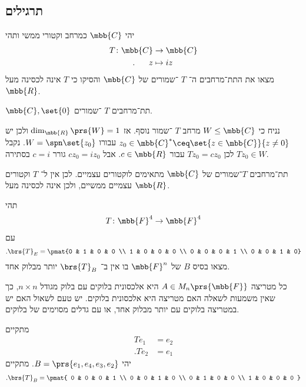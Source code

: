 \documentclass[a4paper,10pt,oneside,openany]{article}
\begin{document}
\subsection{תרגילים}

\begin{exercise}
יהי
$\mbb{C}$
כמרחב וקטורי ממשי ותהי
\begin{align*}
T \colon \mbb{C} &\to \mbb{C} \\
\text{.} \hphantom{lala} z &\mapsto iz
\end{align*}
מצאו את התת־מרחבים ה־%
$T$%
־שמורים של
$\mbb{C}$
והסיקו כי
$T$
אינה לכסינה מעל
$\mbb{R}$.
\end{exercise}

\begin{solution}
$\mbb{C}, \set{0}$
תת־מרחבים
$T$%
־שמורים.

נניח כי
$W \leq \mbb{C}$
מרחב
$T$%
־שמור נוסף. אז
$\dim_{\mbb{R}}\prs{W} = 1$
ולכן יש
$z_0 \in \mbb{C}^* \ceq \set{z \in \mbb{C}}{z \neq 0}$
עבורו
$W = \spn\set{z_0}$.
נקבל
$Tz_0 \in W$
לכן
$Tz_0 = c z_0$
עבור
$c \in \mbb{R}$.
אבל
$c z_0 = i z_0$
גורר
$c = i$
בסתירה.

תת־מרחבים $T$־שמורים של
$\mbb{C}$
מתאימים לוקטורים עצמיים. לכן אין ל־%
$T$
וקטורים עצמיים ממשיים, ולכן אינה לכסינה מעל
$\mbb{R}$.
\end{solution}

\begin{exercise}
תהי
\begin{align*}
T \colon \mbb{F}^4 \to \mbb{F}^4
\end{align*}
עם
\[\text{.} \brs{T}_E = \pmat{0 & 1 & 0 & 0 \\ 1 & 0 & 0 & 0 \\ 0 & 0 & 0 & 1 \\ 0 & 0 & 1 & 0}\]
מצאו בסיס
$B$
של
$\mbb{F}^n$
בו אין ב־%
$\brs{T}_B$
יותר מבלוק אחד.
\end{exercise}

\begin{remark}
כל מטריצה
$A \in M_n\prs{\mbb{F}}$
היא אלכסונית בלוקים עם בלוק מגודל
$n \times n$,
כך שאין משמעות לשאלה האם מטריצה היא אלכסונית בלוקים. יש טעם לשאול האם יש במטריצה בלוקים עם יותר מבלוק אחד, או עם גדלים מסוימים של בלוקים.
\end{remark}

\begin{solution}
מתקיים
\begin{align*}
T e_1 &= e_2 \\
\text{.} T e_2 &= e_1
\end{align*}
יהי
$B = \prs{e_1, e_4, e_3, e_2}$.
מתקיים
\begin{align*}
\text{.} \brs{T}_B = \pmat{
0 & 0 & 0 & 1 \\
0 & 0 & 1 & 0 \\
0 & 1 & 0 & 0 \\
1 & 0 & 0 & 0
}
\end{align*}
\end{solution}
\end{document}
